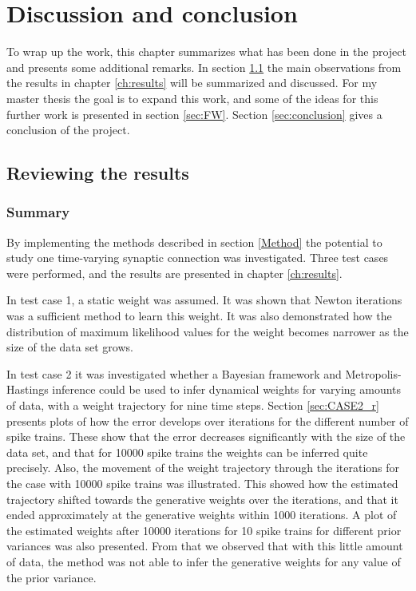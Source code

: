 
\chapter{Discussion and conclusion}
\label{ch:6}

To wrap up the work, this chapter summarizes what has been done in the project and presents some additional remarks. In section \ref{sec:review} the main observations from the results in chapter \ref{ch:results} will be summarized and discussed. For my master thesis the goal is to expand this work, and some of the ideas for this further work is presented in section \ref{sec:FW}. Section \ref{sec:conclusion} gives a conclusion of the project.  

\section{Reviewing the results}
\label{sec:review}
\subsection{Summary}
By implementing the methods described in section \ref{Method} the potential to study one time-varying synaptic connection was investigated. Three test cases were performed, and the results are presented in chapter \ref{ch:results}. 

In test case 1, a static weight was assumed. It was shown that Newton iterations was a sufficient method to learn this weight. It was also demonstrated how the distribution of maximum likelihood values for the weight becomes narrower as the size of the data set grows. 

In test case 2 it was investigated whether a Bayesian framework and Metropolis-Hastings inference could be used to infer dynamical weights for varying amounts of data, with a weight trajectory for nine time steps. Section \ref{sec:CASE2_r} presents plots of how the error develops over iterations for the different number of spike trains. These show that the error decreases significantly with the size of the data set, and that for 10000 spike trains the weights can be inferred quite precisely. Also, the movement of the weight trajectory through the iterations for the case with 10000 spike trains was illustrated. This showed how the estimated trajectory shifted towards the generative weights over the iterations, and that it ended approximately at the generative weights within 1000 iterations. A plot of the estimated weights after 10000 iterations for 10 spike trains for different prior variances was also presented. From that we observed that with this little amount of data, the method was not able to infer the generative weights for any value of the prior variance. 

